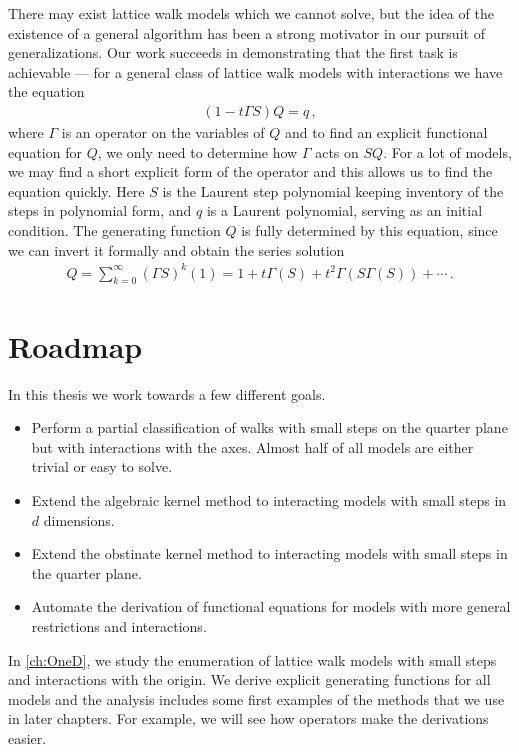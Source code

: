 There may exist lattice walk models which we cannot solve, but the idea of the existence of a general algorithm has been a strong motivator in our pursuit of generalizations. Our work succeeds in demonstrating that the first task is achievable --- for a general class of lattice walk models with interactions we have the equation
\begin{align}
	(1- t\Gamma S) Q = q\,,
\end{align}
where $\Gamma$ is an operator on the variables of $Q$ and to find an explicit functional equation for $Q$, we only need to determine how $\Gamma$ acts on $SQ$. For a lot of models, we may find a short explicit form of the operator and this allows us to find the equation quickly. Here $S$ is the Laurent step polynomial keeping inventory of the steps in polynomial form, and $q$ is a Laurent polynomial, serving as an initial condition. The generating function $Q$ is fully determined by this equation, since we can invert it formally and obtain the series solution
\begin{align}
	Q = \sum_{k=0}^\infty (\Gamma S)^k(1) = 1 + t\Gamma(S) + t^2 \Gamma(S\Gamma(S)) + \cdots\,.
\end{align}
\section{Roadmap}

In this thesis we work towards a few different goals.
\begin{itemize}
	\item[1.] Perform a partial classification of walks with small steps on the quarter plane but with interactions with the axes. Almost half of all models are either trivial or easy to solve.
	\item[2.] Extend the algebraic kernel method to interacting models with small steps in $d$ dimensions. 
	\item[3.] Extend the obstinate kernel method to interacting models with small steps in the quarter plane.
	\item[4.] Automate the derivation of functional equations for \highD models with more general restrictions and interactions.
\end{itemize}

In \autoref{ch:OneD}, we study the enumeration of \oneD lattice walk models with small steps and interactions with the origin. We derive explicit generating functions for all models and the analysis includes some first examples of the methods that we use in later chapters. For example, we will see how operators make the derivations easier.

